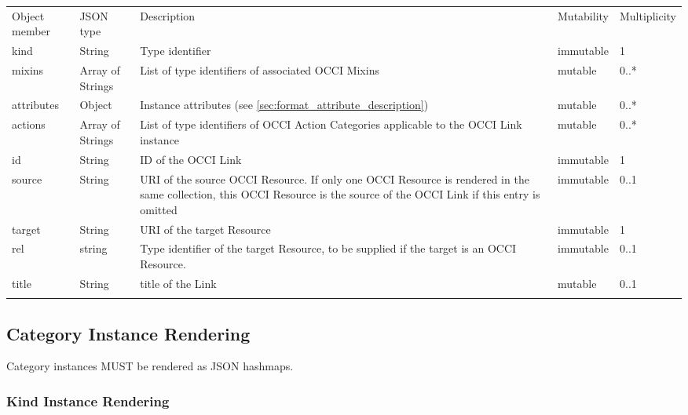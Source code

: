 \documentclass[10pt,a4paper]{article}
\begin{document}
 {
    \begin{tabularx}{\textwidth}{llXll}
    \toprule
    Object member & JSON type & Description & Mutability & Multiplicity \\
    \colrule
    kind & String & Type identifier & immutable & 1 \\

    mixins & Array of Strings & List of type identifiers of associated OCCI
Mixins &
    mutable & 0..* \\

    attributes & Object & Instance attributes (see
\ref{sec:format_attribute_description}) & mutable & 0..* \\

    actions & Array of Strings & List of type identifiers of OCCI
Action Categories applicable to the OCCI Link instance & mutable & 0..* \\

    id & String & ID of the OCCI Link & immutable & 1\\

    source & String & URI of the source OCCI Resource. If only one OCCI
Resource is rendered in the same collection, this OCCI Resource is the
source of the OCCI Link if this entry is omitted & immutable & 0..1\\

    target & String & URI of the target Resource & immutable & 1\\

    rel & string & Type identifier of the target Resource, to be supplied if
the target is an OCCI Resource. & immutable & 0..1 \\
	title & String & title of the Link & mutable & 0..1\\
    \botrule
    \end{tabularx}
}



\subsection{Category Instance Rendering}
\label{sec:format_category_instance_rendering}
Category instances MUST be rendered as JSON hashmaps.

\subsubsection{Kind Instance Rendering}
\label{sec:format_kind}
\end{document}
